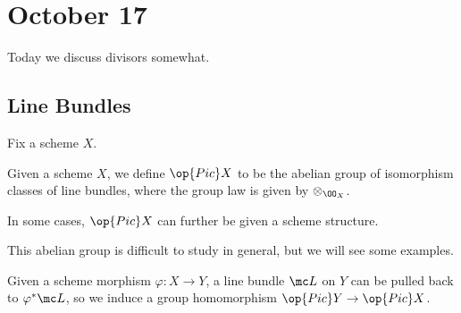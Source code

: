 \documentclass[../notes.tex]{subfiles}
\begin{document}
\section{October 17}

Today we discuss divisors somewhat.

\subsection{Line Bundles}
Fix a scheme $X$.
\begin{notation}
	Given a scheme $X$, we define $\op{Pic}X$ to be the abelian group of isomorphism classes of line bundles, where the group law is given by $\otimes_{\OO_X}$.
\end{notation}
\begin{remark}
	In some cases, $\op{Pic}X$ can further be given a scheme structure.
\end{remark}
This abelian group is difficult to study in general, but we will see some examples.
\begin{remark}
	Given a scheme morphism $\varphi\colon X\to Y$, a line bundle $\mc L$ on $Y$ can be pulled back to $\varphi^*\mc L$, so we induce a group homomorphism $\op{Pic}Y\to\op{Pic}X$.
\end{remark}
\end{document}
